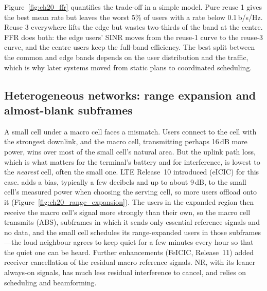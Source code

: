 Figure~\ref{fig:ch20_ffr} quantifies the trade-off in a simple model. Pure reuse 1 gives the best mean rate but leaves
the worst 5\% of users with a rate below 0.1\,b/s/Hz. Reuse 3 everywhere lifts the edge but wastes two-thirds of the
band at the centre. FFR does both: the edge users' SINR moves from the reuse-1 curve to the reuse-3 curve, and the
centre users keep the full-band efficiency. The best split between the common and edge bands depends on the user
distribution and the traffic, which is why later systems moved from static plans to coordinated scheduling.


\subsection{Heterogeneous networks: range expansion and almost-blank subframes}

A small cell under a macro cell faces a mismatch. Users connect to the cell with the strongest downlink, and the
macro cell, transmitting perhaps 16\,dB more power, wins over most of the small cell's natural area. But the
uplink path loss, which is what matters for the terminal's battery and for interference, is lowest to the
\emph{nearest} cell, often the small one. LTE Release~10 introduced  (eICIC) for this case.
 adds a bias, typically a few decibels and up to about 9\,dB, to the small cell's
measured power when choosing the serving cell, so more users offload onto it (Figure~\ref{fig:ch20_range_expansion}).
The users in the expanded region then receive the macro cell's signal more strongly than their own, so the macro
cell transmits  (ABS), subframes in which it sends only essential reference signals
and no data, and the small cell schedules its range-expanded users in those subframes---the loud neighbour agrees
to keep quiet for a few minutes every hour so that the quiet one can be heard. Further enhancements (FeICIC,
Release~11) added receiver cancellation of the residual macro reference signals. NR, with its leaner always-on
signals, has much less residual interference to cancel, and relies on scheduling and beamforming.

